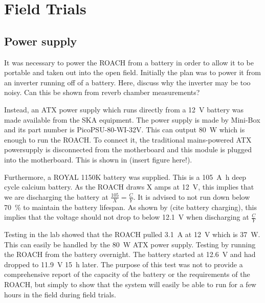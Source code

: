 \chapter{Field Trials}

\section{Power supply}
It was necessary to power the ROACH from a battery in order to allow it to be portable and taken out into the open field.
Initially the plan was to power it from an inverter running off of a battery. Here, discuss why the inverter may be too noisy. Can this be shown from reverb chamber measurements?

Instead, an ATX power supply which runs directly from a \SI{12}{\volt} battery was made available from the SKA equipment. The power supply is made by Mini-Box and its part number is PicoPSU-80-WI-32V. This can output \SI{80}{\watt} which is enough to run the ROACH. To connect it, the traditional mains-powered ATX powersupply is disconnected from the motherboard and this module is plugged into the motherboard. This is shown in (insert figure here!).

Furthermore, a ROYAL 1150K battery was supplied. This is a \SI{105}{\ampere\hour} deep cycle calcium battery.
As the ROACH draws X amps at \SI{12}{\volt}, this implies that we are discharging the battery at \(\frac{105}{X} = \frac{C}{Y}\).
It is advised to not run down below \SI{70}{\percent} to maintain the battery lifespan. As shown by (cite battery charging), this implies that the voltage should not drop to below \SI{12.1}{\volt} when discharging at \(\frac{C}{Y}\)

Testing in the lab showed that the ROACH pulled \SI{3.1}{\ampere} at \SI{12}{\volt} which is \SI{37}{\watt}. This can easily be handled by the \SI{80}{\watt} ATX power supply. 
Testing by running the ROACH from the battery overnight. The battery started at \SI{12.6}{\volt} and had dropped to \SI{11.9}{\volt} \SI{15}{\hour} later. The purpose of this test was not to provide a comprehensive report of the capacity of the battery or the requirements of the ROACH, but simply to show that the system will easily be able to run for a few hours in the field during field trials.
